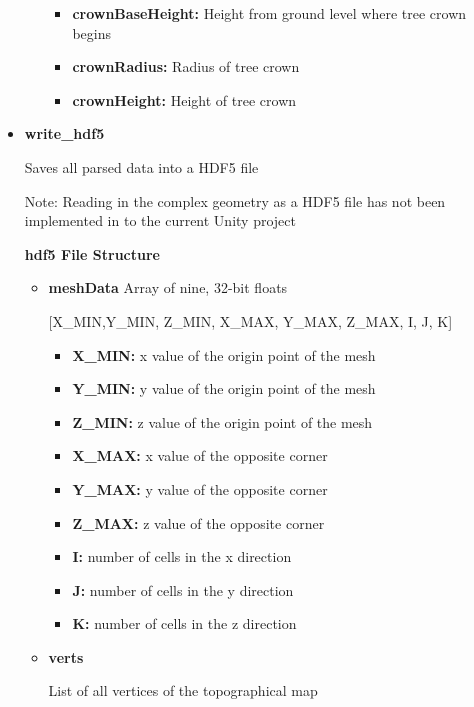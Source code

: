 \begin{itemize}
\begin{itemize}
\begin{itemize}
                    \item\textbf{crownBaseHeight:} Height from ground level where tree crown begins
                    \item\textbf{crownRadius:} Radius of tree crown
                    \item\textbf{crownHeight:} Height of tree crown 
                    \end{itemize}
                \end{itemize} 
    \item \textbf{write\_hdf5}
    \item[] Saves all parsed data into a HDF5 file 
    \item[Note:] Reading in the complex geometry as a HDF5 file has not been implemented in to the current Unity project
                \item[] \textbf{hdf5 File Structure}   
                \begin{itemize}
                \item\textbf{meshData} Array of nine, 32-bit floats
                \item[] [X\_MIN,Y\_MIN, Z\_MIN, X\_MAX, Y\_MAX, Z\_MAX, I, J, K]
                    \begin{itemize}
                    \item\textbf{X\_MIN:} x value of the origin point of the mesh 
                    \item\textbf{Y\_MIN:} y value of the origin point of the mesh 
                    \item\textbf{Z\_MIN:} z value of the origin point of the mesh 
                    \item\textbf{X\_MAX:} x value of the opposite corner
                    \item\textbf{Y\_MAX:} y value of the opposite corner
                    \item\textbf{Z\_MAX:} z value of the opposite corner
                    \item\textbf{I:} number of cells in the x direction
                    \item\textbf{J:} number of cells in the y direction
                    \item\textbf{K:} number of cells in the z direction
                    \end{itemize}
                \item\textbf{verts} 
                \item[] List of all vertices of the topographical map

\end{itemize}
\end{itemize}
